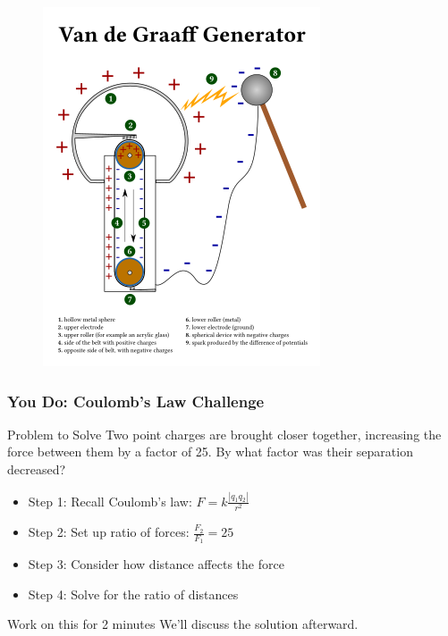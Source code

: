 \documentclass{beamer}
\begin{document}
\begin{frame}{}
    \begin{figure}
        \centering
        \includegraphics[width=0.6\linewidth]{phys12-electrostatics-van-de-graaff-generator.png}
    \end{figure}
\end{frame}

\begin{frame}
    \frametitle{You Do: Coulomb's Law Challenge}
    
    \begin{exampleblock}{Problem to Solve}
        Two point charges are brought closer together, increasing the force between them by a factor of 25. By what factor was their separation decreased?
    \end{exampleblock}
    
    \begin{itemize}
        \item Step 1: Recall Coulomb's law: $F = k\frac{|q_1 q_2|}{r^2}$
        \item Step 2: Set up ratio of forces: $\frac{F_2}{F_1} = 25$
        \item Step 3: Consider how distance affects the force
        \item Step 4: Solve for the ratio of distances
    \end{itemize}
    
    \begin{alertblock}{Work on this for 2 minutes}
        We'll discuss the solution afterward.
    \end{alertblock}
\end{frame}
\end{document}
